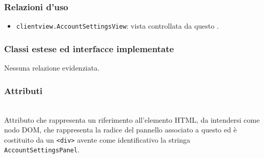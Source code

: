 \subsubsection*{Relazioni d'uso}
\begin{itemize}
  \item \texttt{clientview.AccountSettingsView}: vista controllata da questo .
\end{itemize}

\subsubsection*{Classi estese ed interfacce implementate}
Nessuna relazione evidenziata.

\subsubsection*{Attributi}
\begin{description}
\item{}\\
Attributo che rappresenta un riferimento all'elemento HTML, da intendersi come nodo DOM, che rappresenta la radice del pannello associato a questo  ed è costituito da un \verb'<div>' avente come identificativo la stringa \verb'AccountSettingsPanel'.
\end{description}

